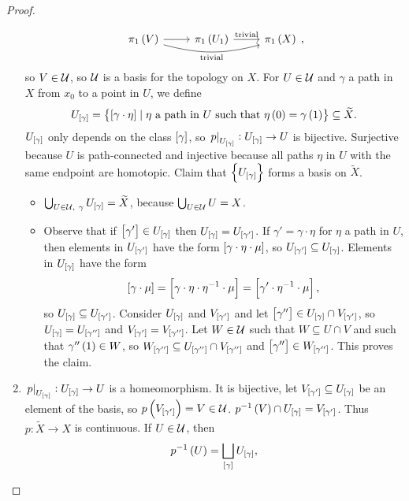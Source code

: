 \begin{proof}
\begin{enumerate}
$$\begin{tikzcd}
\pi_1\br{V} \arrow{r} \arrow[bend right=15, swap]{rr}{\text{trivial}} & \pi_1\br{U_1} \arrow{r}{\text{trivial}} & \pi_1\br{X}
\end{tikzcd},
$$
so $ V \in \mathcal{U} $, so $ \mathcal{U} $ is a basis for the topology on $ X $. For $ U \in \mathcal{U} $ and $ \gamma $ a path in $ X $ from $ x_0 $ to a point in $ U $, we define
$$ U_{\sbr{\gamma}} = \cbr{\sbr{\gamma \cdot \eta} \mid \eta \ \text{a path in} \ U \ \text{such that} \ \eta\br{0} = \gamma\br{1}} \subseteq \widetilde{X}. $$
$ U_{\sbr{\gamma}} $ only depends on the class $ \sbr{\gamma} $, so $ \eval{p}_{U_{\sbr{\gamma}}} : U_{\sbr{\gamma}} \to U $ is bijective. Surjective because $ U $ is path-connected and injective because all paths $ \eta $ in $ U $ with the same endpoint are homotopic. Claim that $ \cbr{U_{\sbr{\gamma}}} $ forms a basis on $ \widetilde{X} $.
\begin{itemize}
\item $ \bigcup_{U \in \UU, \ \gamma} U_{\sbr{\gamma}} = \widetilde{X} $, because $ \bigcup_{U \in \mathcal{U}} U = X $.
\item Observe that if $ \sbr{\gamma'} \in U_{\sbr{\gamma}} $ then $ U_{\sbr{\gamma}} = U_{\sbr{\gamma'}} $. If $ \gamma' = \gamma \cdot \eta $ for $ \eta $ a path in $ U $, then elements in $ U_{\sbr{\gamma'}} $ have the form $ \sbr{\gamma \cdot \eta \cdot \mu} $, so $ U_{\sbr{\gamma'}} \subseteq U_{\sbr{\gamma}} $. Elements in $ U_{\sbr{\gamma}} $ have the form
$$ \sbr{\gamma \cdot \mu} = \sbr{\gamma \cdot \eta \cdot \eta^{-1} \cdot \mu} = \sbr{\gamma' \cdot \eta^{-1} \cdot \mu}, $$
so $ U_{\sbr{\gamma}} \subseteq U_{\sbr{\gamma'}} $. Consider $ U_{\sbr{\gamma}} $ and $ V_{\sbr{\gamma'}} $ and let $ \sbr{\gamma''} \in U_{\sbr{\gamma}} \cap V_{\sbr{\gamma'}} $, so $ U_{\sbr{\gamma}} = U_{\sbr{\gamma''}} $ and $ V_{\sbr{\gamma'}} = V_{\sbr{\gamma''}} $. Let $ W \in \mathcal{U} $ such that $ W \subseteq U \cap V $ and such that $ \gamma''\br{1} \in W $, so $ W_{\sbr{\gamma''}} \subseteq U_{\sbr{\gamma''}} \cap V_{\sbr{\gamma''}} $ and $ \sbr{\gamma''} \in W_{\sbr{\gamma''}} $. This proves the claim.
\end{itemize}
\item $ \eval{p}_{U_{\sbr{\gamma}}} : U_{\sbr{\gamma}} \to U $ is a homeomorphism. It is bijective, let $ V_{\sbr{\gamma'}} \subseteq U_{\sbr{\gamma}} $ be an element of the basis, so $ p\br{V_{\sbr{\gamma'}}} = V \in \UU $. $ p^{-1}\br{V} \cap U_{\sbr{\gamma}} = V_{\sbr{\gamma'}} $. Thus $ p : \widetilde{X} \to X $ is continuous. If $ U \in \mathcal{U} $, then
$$ p^{-1}\br{U} = \bigsqcup_{\sbr{\gamma}} U_{\sbr{\gamma}}, $$

\end{enumerate}
\end{proof}
